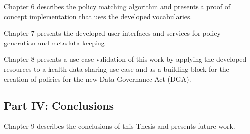 Chapter 6 describes the policy matching algorithm and presents a proof of concept implementation that uses the developed vocabularies.

Chapter 7 presents the developed user interfaces and services for policy generation and metadata-keeping.

Chapter 8 presents a use case validation of this work by applying the developed resources to a health data sharing use case and as a building block for the creation of policies for the new Data Governance Act (DGA).

\subsection*{Part IV: Conclusions}

Chapter 9 describes the conclusions of this Thesis and presents future work.